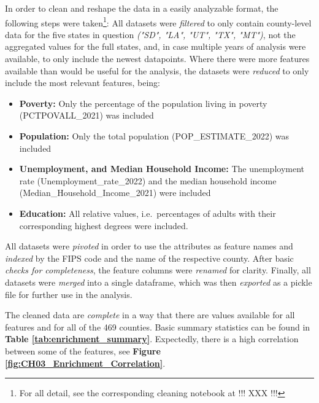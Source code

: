 In order to clean and reshape the data in a easily analyzable format, the following steps were taken\footnote{For all detail, see the corresponding cleaning notebook at !!! XXX !!!}:
All datasets were \textit{filtered} to only contain county-level data for the five states in question \textit{("SD", "LA", "UT", "TX", "MT")}, not the aggregated values for the full states, and, in case multiple years of analysis were available, to only include the newest datapoints. 
Where there were more features available than would be useful for the analysis, the datasets were \textit{reduced} to only include the most relevant features, being:

\begin{itemize}
    \item \textbf{Poverty:} Only the percentage of the population living in poverty (PCTPOVALL\_2021) was included
    \item \textbf{Population:} Only the total population (POP\_ESTIMATE\_2022) was included
    \item \textbf{Unemployment, and Median Household Income:} The unemployment rate (Unemployment\_rate\_2022) and the median household income (Median\_Household\_Income\_2021) were included
    \item \textbf{Education:} All relative values, i.e.\ percentages of adults with their corresponding highest degrees were included.
\end{itemize}

All datasets were \textit{pivoted} in order to use the attributes as feature names and \textit{indexed} by the FIPS code and the name of the respective county. 
After basic \textit{checks for completeness}, the feature columns were \textit{renamed} for clarity. Finally, all datasets were \textit{merged} into a single dataframe, which was then \textit{exported} as a pickle file for further use in the analysis.

The cleaned data are \textit{complete} in a way that there are values available for all features and for all of the 469 counties. Basic summary statistics can be found in \textbf{Table \ref{tab:enrichment_summary}}. 
Expectedly, there is a high correlation between some of the features, see \textbf{Figure \ref{fig:CH03_Enrichment_Correlation}}.

